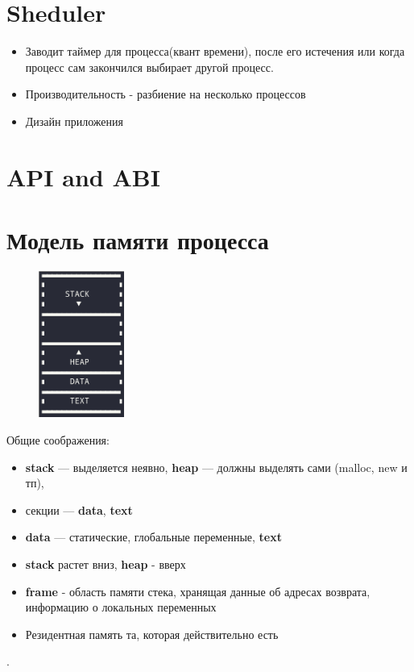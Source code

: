 \documentclass[../lectures.tex]{subfiles}
\begin{document}
\section{Sheduler}
\begin{itemize}
    \item Заводит таймер для процесса(квант времени), после его истечения 
    или когда процесс сам закончился выбирает другой процесс.

    \item Производительность - разбиение на несколько процессов

    \item Дизайн приложения
\end{itemize}
\section{API and ABI}
\todo{}

\newpage
\section{Модель памяти процесса}
\begin{figure}
    \includegraphics[width=0.25\textwidth]{images/memory.png}
\end{figure}
\hspace{15pt} Общие соображения:
\begin{itemize}
    \item \textbf{stack} --- выделяется неявно, \textbf{heap} --- должны выделять сами (malloc, new и тп),
    \item секции --- \textbf{data}, \textbf{text}
    \item \textbf{data} --- статические, глобальные переменные, \textbf{text}
    \item \textbf{stack} растет вниз, \textbf{heap} - вверх
    \item \textbf{frame} - область памяти стека, хранящая данные об адресах возврата, информацию о локальных переменных
    \item Резидентная память та, которая действительно есть
\end{itemize}
.\\
\end{document}
